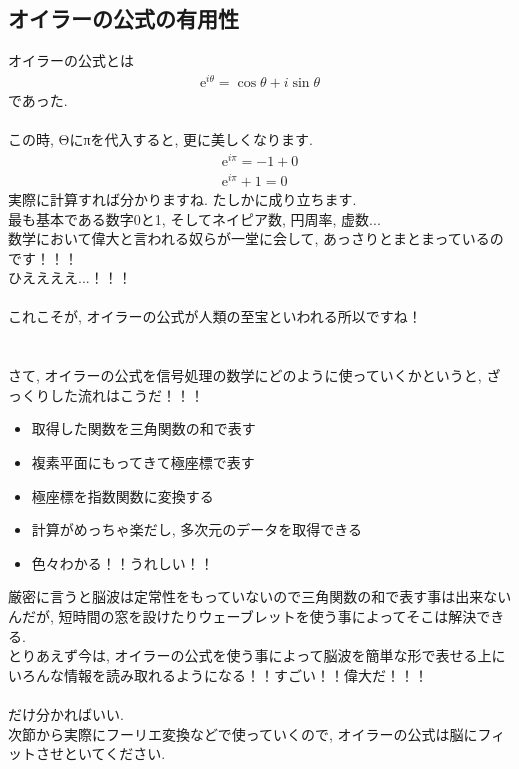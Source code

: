 \documentclass[11pt,a4paper,uplatex]{ujreport} 	%
\begin{document}
\subsection{オイラーの公式の有用性}
オイラーの公式とは
\begin{eqnarray}
\mathrm{e}^{i\theta} = \cos \theta + i\sin \theta
\end{eqnarray}
であった.\\
\\
この時, Θにπを代入すると, 更に美しくなります.
\\
\begin{eqnarray}
\mathrm{e}^{i\pi} = -1 + 0\\
\mathrm{e}^{i\pi} + 1 = 0
\end{eqnarray}
実際に計算すれば分かりますね. たしかに成り立ちます. \\
最も基本である数字0と1, そしてネイピア数, 円周率, 虚数...\\
数学において偉大と言われる奴らが一堂に会して, あっさりとまとまっているのです！！！\\
ひええええ...！！！\\
\\
これこそが, オイラーの公式が人類の至宝といわれる所以ですね！\\
\\
\\
さて, オイラーの公式を信号処理の数学にどのように使っていくかというと, ざっくりした流れはこうだ！！！\\
\begin{itemize}
 \item 取得した関数を三角関数の和で表す
 \item 複素平面にもってきて極座標で表す
 \item 極座標を指数関数に変換する
 \item 計算がめっちゃ楽だし, 多次元のデータを取得できる
 \item 色々わかる！！うれしい！！
\end{itemize}
厳密に言うと脳波は定常性をもっていないので三角関数の和で表す事は出来ないんだが, 短時間の窓を設けたりウェーブレットを使う事によってそこは解決できる. \\
とりあえず今は, オイラーの公式を使う事によって脳波を簡単な形で表せる上にいろんな情報を読み取れるようになる！！すごい！！偉大だ！！！\\
\\
だけ分かればいい.\\
次節から実際にフーリエ変換などで使っていくので, オイラーの公式は脳にフィットさせといてください.\\
\end{document}
